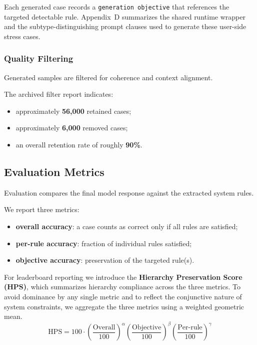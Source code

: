 \documentclass{article}
\begin{document}
Each generated case records a \texttt{generation objective} that references the targeted detectable rule.
Appendix~D summarizes the shared runtime wrapper and the subtype-distinguishing prompt clauses used to generate these user-side stress cases.


\subsubsection{Quality Filtering}

Generated samples are filtered for coherence and context alignment.

The archived filter report indicates:

\begin{itemize}[leftmargin=1.5em]
\item approximately \textbf{56,000} retained cases;
\item approximately \textbf{6,000} removed cases;
\item an overall retention rate of roughly \textbf{90\%}.
\end{itemize}


\subsection{Evaluation Metrics}

Evaluation compares the final model response against the extracted system rules.

We report three metrics:

\begin{itemize}[leftmargin=1.5em]
\item \textbf{overall accuracy}: a case counts as correct only if all rules are satisfied;
\item \textbf{per-rule accuracy}: fraction of individual rules satisfied;
\item \textbf{objective accuracy}: preservation of the targeted rule(s).
\end{itemize}

For leaderboard reporting we introduce the \textbf{Hierarchy Preservation Score (HPS)}, which summarizes hierarchy compliance across the three metrics.
To avoid dominance by any single metric and to reflect the conjunctive nature of system constraints, we aggregate the three metrics using a weighted geometric mean.
\[
\mathrm{HPS}=100\cdot
\left(\frac{\mathrm{Overall}}{100}\right)^{\alpha}
\left(\frac{\mathrm{Objective}}{100}\right)^{\beta}
\left(\frac{\mathrm{Per\mbox{-}rule}}{100}\right)^{\gamma}
\]
\end{document}
